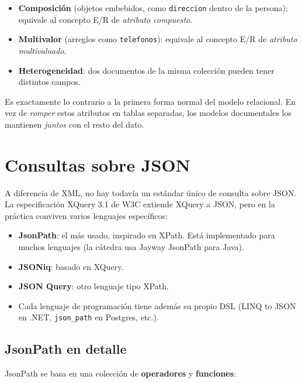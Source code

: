 \documentclass[11pt,a4paper]{article}
\begin{document}
\begin{itemize}
    \item \textbf{Composición} (objetos embebidos, como
    \texttt{direccion} dentro de la persona): equivale al concepto E/R
    de \emph{atributo compuesto}.
    \item \textbf{Multivalor} (arreglos como \texttt{telefonos}):
    equivale al concepto E/R de \emph{atributo multivaluado}.
    \item \textbf{Heterogeneidad}: dos documentos de la misma colección
    pueden tener distintos campos.
\end{itemize}

Es exactamente lo contrario a la primera forma normal del modelo
relacional. En vez de \emph{romper} estos atributos en tablas separadas,
los modelos documentales los mantienen \emph{juntos} con el resto del
dato.

\section{Consultas sobre JSON}

A diferencia de XML, no hay todavía un estándar único de consulta sobre
JSON. La especificación XQuery 3.1 de W3C extiende XQuery a JSON, pero
en la práctica conviven varios lenguajes específicos:

\begin{itemize}
    \item \textbf{JsonPath}: el más usado, inspirado en XPath. Está
    implementado para muchos lenguajes (la cátedra usa Jayway JsonPath
    para Java).
    \item \textbf{JSONiq}: basado en XQuery.
    \item \textbf{JSON Query}: otro lenguaje tipo XPath.
    \item Cada lenguaje de programación tiene además su propio DSL
    (LINQ to JSON en .NET, \texttt{json\_path} en Postgres, etc.).
\end{itemize}

\subsection{JsonPath en detalle}

JsonPath se basa en una colección de \textbf{operadores} y
\textbf{funciones}:
\end{document}
